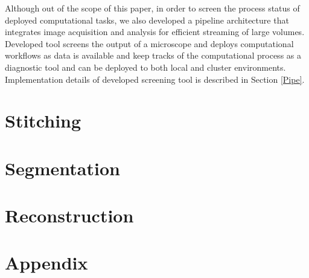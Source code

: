\documentclass{article}
\begin{document}
Although out of the scope of this paper, in order to screen the process status of deployed computational tasks, we also developed a pipeline architecture that integrates image acquisition and analysis for efficient streaming of large volumes. Developed tool screens the output of a microscope and deploys computational workflows as data is available and keep tracks of the computational process as a diagnostic tool and can be deployed to both local and cluster environments. Implementation details of developed screening tool is described in Section \ref{Pipe}.

\section{Stitching}
\label{stitching}


\section{Segmentation}
\label{segmentation}


\section{Reconstruction}
\label{recon}


\section{Appendix}


% 
\printbibliography[
heading=bibintoc,
title={Whole bibliography}
] %

\clearpage

\printbibliography[heading=subbibintoc,type=article,title={Articles only}]
\printbibliography[type=book,title={Books only}]

\printbibliography[keyword={physics},title={Physics-related only}]
\printbibliography[keyword={latex},title={\LaTeX-related only}]
\end{document}
